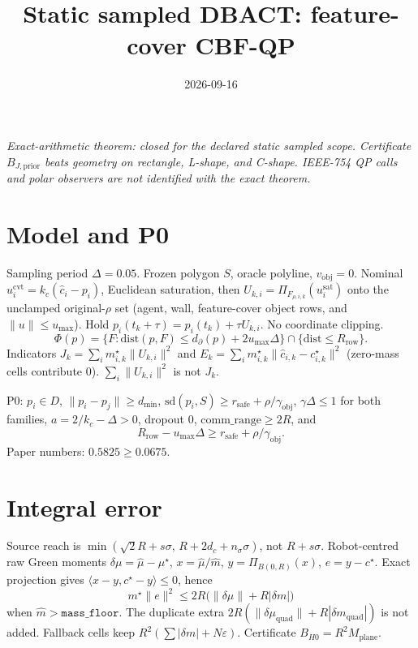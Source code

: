 \documentclass{article}
\title{Static sampled DBACT: feature-cover CBF-QP}
\author{}
\date{2026-09-16}
\begin{document}
\maketitle
\noindent\textit{Exact-arithmetic theorem: closed for the declared static sampled scope.
Certificate \(B_{J,\mathrm{prior}}\) beats geometry on rectangle, L-shape, and C-shape.
IEEE-754 QP calls and polar observers are not identified with the exact theorem.}

\section{Model and P0}
Sampling period \(\Delta=0.05\). Frozen polygon \(S\), oracle polyline, \(v_{\mathrm{obj}}=0\).
Nominal \(u_i^{\mathrm{cvt}}=k_c(\hat c_i-p_i)\), Euclidean saturation, then
\(U_{k,i}=\Pi_{F_{\rho,i,k}}(u_i^{\mathrm{sat}})\) onto the unclamped original-\(\rho\) set
(agent, wall, feature-cover object rows, and \(\|u\|\le u_{\max}\)).
Hold \(p_i(t_k+\tau)=p_i(t_k)+\tau U_{k,i}\). No coordinate clipping.
\[
\Phi(p)=\{F:\mathrm{dist}(p,F)\le d_\partial(p)+2u_{\max}\Delta\}
\cap\{\mathrm{dist}\le R_{\mathrm{row}}\}.
\]
Indicators \(J_k=\sum_i m_{i,k}^\star\|U_{k,i}\|^2\) and
\(E_k=\sum_i m_{i,k}^\star\|\hat c_{i,k}-c_{i,k}^\star\|^2\)
(zero-mass cells contribute \(0\)). \(\sum_i\|U_{k,i}\|^2\) is not \(J_k\).

P0: \(p_i\in D\), \(\|p_i-p_j\|\ge d_{\min}\),
\(\mathrm{sd}(p_i,S)\ge r_{\mathrm{safe}}+\rho/\gamma_{\mathrm{obj}}\),
\(\gamma\Delta\le 1\) for both families, \(a=2/k_c-\Delta>0\), dropout \(0\),
\(\mathrm{comm\_range}\ge 2R\), and
\[
R_{\mathrm{row}}-u_{\max}\Delta\ge r_{\mathrm{safe}}+\rho/\gamma_{\mathrm{obj}}.
\tag{RT}
\]
Paper numbers: \(0.5825\ge 0.0675\).

\section{Integral error}
Source reach is \(\min(\sqrt{2}R+s\sigma,\,R+2d_c+n_\sigma\sigma)\), not \(R+s\sigma\).
Robot-centred raw Green moments \(\delta\mu=\hat\mu-\mu^\star\), \(x=\hat\mu/\hat m\),
\(y=\Pi_{B(0,R)}(x)\), \(e=y-c^\star\). Exact projection gives \(\langle x-y,c^\star-y\rangle\le 0\), hence
\[
m^\star\|e\|^2\le 2R\bigl(\|\delta\mu\|+R|\delta m|\bigr)
\]
when \(\hat m>\mathtt{mass\_floor}\). The duplicate extra
\(2R(\|\delta\mu_{\mathrm{quad}}\|+R|\delta m_{\mathrm{quad}}|)\) is not added.
Fallback cells keep \(R^2(\sum|\delta m|+N\varepsilon)\). Certificate \(B_{H0}=R^2M_{\mathrm{plane}}\).
\end{document}
